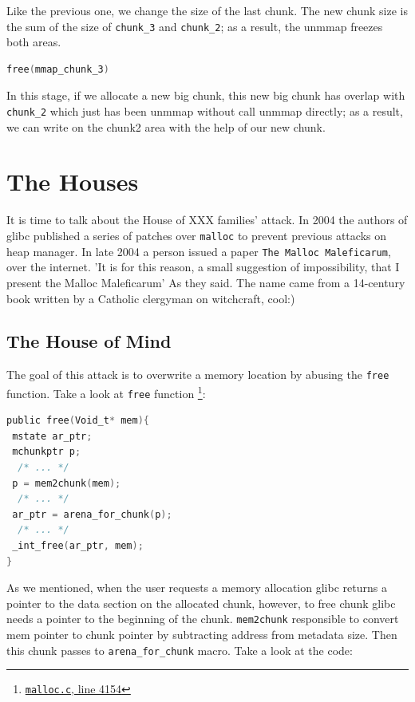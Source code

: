 \documentclass{masterthesis}
\newcommand*\libc{glibc}
\newcommand*\mallocc{\lstinline{malloc}\xspace}
\newcommand*\freec{\lstinline{free}\xspace}
\begin{document}
Like the previous one, we change the size of the last chunk. The new chunk size is the sum of the size of \lstinline{chunk_3} and \lstinline{chunk_2}; as a result, the unmmap freezes both areas.

\begin{lstlisting}[language=c,frame=tlrb]
free(mmap_chunk_3)
 \end{lstlisting}

In this stage, if we allocate a new big chunk, this new big chunk has overlap with \lstinline{chunk_2} which just has been unmmap without call unmmap directly; as a result, we can write on the chunk2 area with the help of our new chunk.

\section{The Houses}

It is time to talk about the House of XXX families' attack. In 2004 the authors of \libc{} published a series of patches over \mallocc{} to prevent previous attacks on heap manager. In late 2004 a person issued a paper \lstinline{The Malloc Maleficarum}, over the internet. 'It is for this reason, a small suggestion of impossibility, that I present the Malloc Maleficarum' As they said. The name came from a 14-century book written by a Catholic clergyman on witchcraft, cool:)

\subsection{The House of Mind}
The goal of this attack is to overwrite a memory location by abusing the \freec{} function. Take a look at \freec{} function \footnote{\href{https://sourceware.org/git/?p=glibc.git;a=blob;f=malloc/malloc.c;h=f7cd29bc2f93e1082ee77800bd64a4b2a2897055;hb=9ea3686266dca3f004ba874745a4087a89682617\#l4154}{\texttt{malloc.c}, line 4154}}:
\begin{lstlisting}[language=c,frame=tlrb]
public free(Void_t* mem){
 mstate ar_ptr;
 mchunkptr p;
  /* ... */
 p = mem2chunk(mem);
  /* ... */
 ar_ptr = arena_for_chunk(p);
  /* ... */
 _int_free(ar_ptr, mem);
}
 \end{lstlisting}
As we mentioned, when the user requests a memory allocation \libc{} returns a pointer to the data section on the allocated chunk, however, to free chunk \libc{} needs a pointer to the beginning of the chunk. \lstinline{mem2chunk} responsible to convert mem pointer to chunk pointer by subtracting address from metadata size. Then this chunk passes to \lstinline{arena_for_chunk} macro. Take a look at the code:
\end{document}
